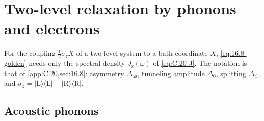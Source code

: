 \section{Two-level relaxation by phonons and electrons}\label{app:D.42}

For the coupling $\tfrac12\sigma_z X$ of a two-level system to a bath coordinate $X$, \cref{eq:16.8-golden} needs only the spectral density $J_{\mathrm{s}}(\omega)$ of \cref{eq:C.20-J}. The notation is that of \cref{app:C.20,sec:16.8}: asymmetry $\Delta_{\mathrm{as}}$, tunneling amplitude $\Delta_0$, splitting $\Delta_{\mathrm{tl}}$, and $\sigma_z = |\mathrm{L}\rangle\langle\mathrm{L}| - |\mathrm{R}\rangle\langle\mathrm{R}|$.

\subsection*{Acoustic phonons}

